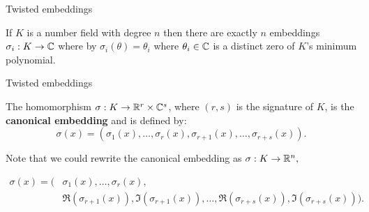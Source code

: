 \documentclass[notheorems, bigger]{beamer}
\begin{document}
\begin{frame}[label={sec:org7d48d9e}]{Twisted embeddings}
\begin{theorem}
  If $K$ is a number field with degree $n$ then there are
  exactly $n$ embeddings $\sigma_i : K \rightarrow \mathbb{C}$ where by $\sigma_i(\theta) =
  \theta_i$ where $\theta_i \in \mathbb{C}$ is a distinct zero of $K$'s
  minimum polynomial.
\end{theorem}
\end{frame}

\begin{frame}[label={sec:orgff835c3}]{Twisted embeddings}
\begin{text}
  The homomorphism $\sigma: K \rightarrow \mathbb{R}^r \times \mathbb{C}^s$, where $(r,s)$ is the signature of $K$, is the \textbf{canonical embedding} and is defined by:
  \[
  \sigma(x) = \left(\sigma_1(x), \ldots , \sigma_r(x), \sigma_{r+1}(x), \ldots, \sigma_{r+s}(x) \right).
\]

  Note that we could rewrite the canonical embedding as $\sigma : K \rightarrow \mathbb{R}^n,$

  \begin{align*}
    \sigma(x) = (& \sigma_1(x), \ldots , \sigma_r(x), \\
            & \Re(\sigma_{r+1}(x)), \Im(\sigma_{r+1}(x)), \ldots, \Re(\sigma_{r+s}(x)), \Im(\sigma_{r+s}(x)) ).
  \end{align*}

\end{text}
\end{frame}
\end{document}
